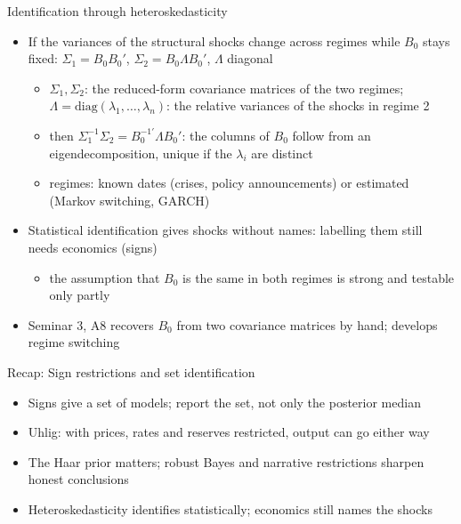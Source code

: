 \begin{frame}{Identification through heteroskedasticity}
\itemsize{\small}
\begin{itemize}
    \item If the variances of the structural shocks change across regimes while $B_0$ stays fixed: $\Sigma_1 = B_0B_0'$, $\Sigma_2 = B_0\Lambda B_0'$, $\Lambda$ diagonal 
    \begin{itemize}
        \item $\Sigma_1, \Sigma_2$: the reduced-form covariance matrices of the two regimes; $\Lambda = \mathrm{diag}(\lambda_1, \dots, \lambda_n)$: the relative variances of the shocks in regime 2
        \item then $\Sigma_1^{-1}\Sigma_2 = B_0^{-1\prime}\Lambda B_0'$: the columns of $B_0$ follow from an eigendecomposition, unique if the $\lambda_i$ are distinct
        \item regimes: known dates (crises, policy announcements) or estimated (Markov switching, GARCH) 
    \end{itemize}
    \item Statistical identification gives shocks without names: labelling them still needs economics (signs)
    \begin{itemize}
        \item the assumption that $B_0$ is the same in both regimes is strong and testable only partly
    \end{itemize}
    \item Seminar 3, A8 recovers $B_0$ from two covariance matrices by hand;  develops regime switching
\end{itemize}
\end{frame}

\begin{frame}{Recap: Sign restrictions and set identification}
\itemsize{\small}
\begin{itemize}
    \item Signs give a set of models; report the set, not only the posterior median
    \item Uhlig: with prices, rates and reserves restricted, output can go either way
    \item The Haar prior matters; robust Bayes and narrative restrictions sharpen honest conclusions
    \item Heteroskedasticity identifies statistically; economics still names the shocks
\end{itemize}
\end{frame}



